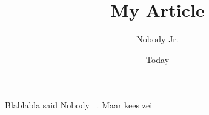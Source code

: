 \documentclass[11pt]{article}
\begin{document}
\title{My Article}
\author{Nobody Jr.}
\date{Today}
\maketitle

Blablabla said Nobody ~\cite{eemcs21972}. Maar kees zei ~\cite{eemcs18152}

{}

\end{document}
